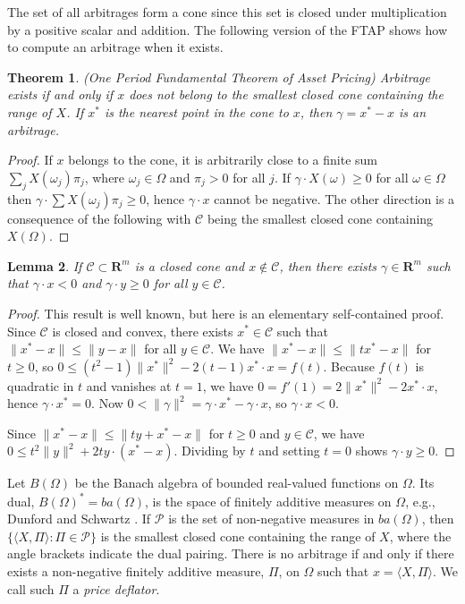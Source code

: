 \documentclass[fleqn]{amsart}
\newcommand{\R}{\mathbf{R}}
\newcommand{\CC}{\mathcal{C}}
\newcommand{\PP}{\mathcal{P}}
\providecommand{\norm}[1]{\lVert#1\rVert}
\providecommand{\pair}[1]{\langle#1\rangle}
\newtheorem{theorem}{Theorem}[section]
\newtheorem{lemma}[theorem]{Lemma}
\begin{document}
The set of all arbitrages form a cone since this set is closed
under multiplication by a positive scalar and addition. The following 
version of the FTAP shows how to compute an arbitrage when it exists.

\begin{theorem}{(One Period Fundamental Theorem of Asset Pricing)}
Arbitrage exists if and only if $x$ does not belong to the smallest
closed cone containing the range of $X$. If $x^*$ is the nearest point in
the cone to $x$, then $\gamma = x^* - x$ is an arbitrage.
\end{theorem}

\begin{proof}
If $x$ belongs to the cone, it is arbitrarily close to a finite sum
$\sum_j X(\omega_j) \pi_j$, where $\omega_j\in\Omega$ and $\pi_j > 0$ for
all $j$. If $\gamma\cdot X(\omega) \ge0$ for all $\omega\in\Omega$ then $\gamma\cdot
\sum X(\omega_j) \pi_j \ge0$, hence $\gamma\cdot x$ cannot be negative. The
other direction is a consequence of the following with $\CC$ being the
smallest closed cone containing $X(\Omega)$.
\end{proof}

\begin{lemma}
If $\CC\subset\R^m$ is a closed cone and $x\not\in \CC$, then there
exists $\gamma\in\R^m$ such that $\gamma\cdot x < 0$ and $\gamma\cdot y \ge0$
for all $y\in \CC$.
\end{lemma}

\begin{proof}
This result is well known, but here is an elementary self-contained
proof.  Since $\CC$ is closed and convex, there exists $x^*\in \CC$
such that $\norm{x^* - x} \le \norm{y - x}$ for all $y\in \CC$.
We have $\norm{x^* - x} \le \norm{tx^* - x}$ for $t \ge 0$, so $0 \le
(t^2 - 1)\norm{x^*}^2 - 2(t - 1)x^{*}\cdot x = f(t)$. Because $f(t)$
is quadratic in $t$ and vanishes at $t = 1$, we have $0 = f'(1) =
2\norm{x^*}^2 - 2x^{*}\cdot x$, hence $\gamma\cdot x^* = 0$.  Now $0 <
\norm{\gamma}^2 = \gamma\cdot x^* - \gamma\cdot x$, so $\gamma\cdot x < 0$.

Since $\norm{x^* - x} \le \norm{ty + x^* - x}$ for $t \ge 0$ and $y\in
\CC$, we have $0 \le t^2\norm{y}^2 + 2ty\cdot(x^* - x)$. Dividing by $t$
and setting $t = 0$ shows $\gamma\cdot y \ge0$.  
\end{proof}

Let $B(\Omega)$ be the Banach algebra of bounded real-valued functions
on $\Omega$. Its dual, $B(\Omega)^* = ba(\Omega)$, is the space of
finitely additive measures on $\Omega$, e.g., Dunford and Schwartz \cite{DunSch1954}.
If $\PP$ is the set of non-negative measures in $ba(\Omega)$, then
$\{\pair{X,\Pi}:\Pi\in\PP\}$ is the smallest closed cone containing
the range of $X$, where the angle brackets indicate the dual pairing.
There is no arbitrage if and only if there exists a non-negative finitely
additive measure, $\Pi$, on $\Omega$ such that $x = \langle X,\Pi\rangle$.
We call such \(\Pi\) a {\em price deflator}.
\end{document}
